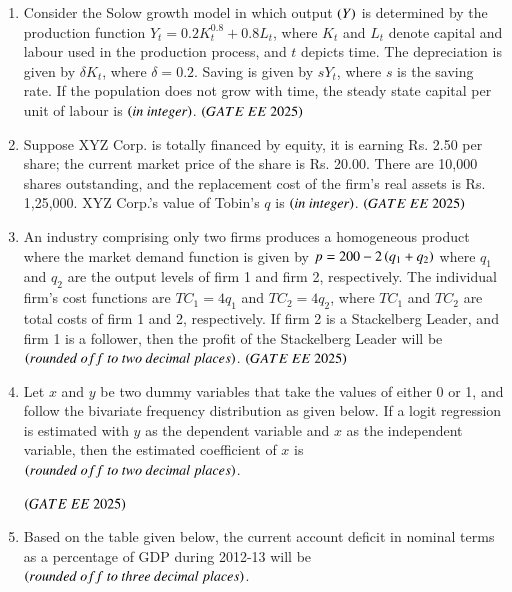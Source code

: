 \documentclass[journal,12pt,onecolumn]{IEEEtran}
\theoremstyle{remark}
\begin{document}
\begin{enumerate}
\item Consider the Solow growth model in which output $\left(Y\right)$ is determined by the production function $Y_t = 0.2 K_t^{0.8} + 0.8 L_t$, where $K_t$ and $L_t$ denote capital and labour used in the production process, and $t$ depicts time. The depreciation is given by $\delta K_t$, where $\delta = 0.2$. Saving is given by $sY_t$, where $s$ is the saving rate. If the population does not grow with time, the steady state capital per unit of labour is \underline{\hspace{2cm}} $\left(in\ integer\right)$. 
\hfill $\brak{GATE\ EE\ 2025}$
\item Suppose XYZ Corp. is totally financed by equity, it is earning Rs. 2.50 per share; the current market price of the share is Rs. 20.00. There are 10,000 shares outstanding, and the replacement cost of the firm's real assets is Rs. 1,25,000. XYZ Corp.'s value of Tobin's $q$ is \underline{\hspace{2cm}} $\left(in\ integer\right)$. 
 \hfill $\brak{GATE\ EE\ 2025}$
\item An industry comprising only two firms produces a homogeneous product where the market demand function is given by $p = 200 - 2\left(q_1 + q_2\right)$ where $q_1$ and $q_2$ are the output levels of firm 1 and firm 2, respectively. The individual firm's cost functions are $TC_1 = 4q_1$ and $TC_2 = 4q_2$, where $TC_1$ and $TC_2$ are total costs of firm 1 and 2, respectively. If firm 2 is a Stackelberg Leader, and firm 1 is a follower, then the profit of the Stackelberg Leader will be \underline{\hspace{2cm}} $\brak{rounded\ off\ to\ two\ decimal\ places}$. 
 \hfill $\brak{GATE\ EE\ 2025}$
\item Let $x$ and $y$ be two dummy variables that take the values of either 0 or 1, and follow the bivariate frequency distribution as given below. If a logit regression is estimated with $y$ as the dependent variable and $x$ as the independent variable, then the estimated coefficient of $x$ is \underline{\hspace{2cm}} $\brak{rounded\ off\ to\ two\ decimal\ places}$.

\begin{center}

\end{center}
 \hfill $\brak{GATE\ EE\ 2025}$
\item Based on the table given below, the current account deficit in nominal terms as a percentage of GDP during 2012-13 will be \underline{\hspace{2cm}} $\brak{rounded\ off\ to\ three\ decimal\ places}$.\\

\begin{center}


\end{center}
\end{enumerate}
\end{document}
